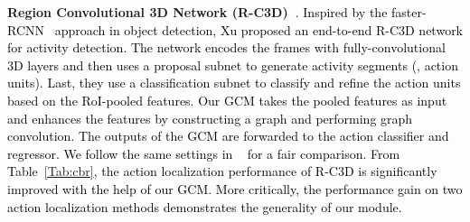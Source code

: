 \documentclass[10pt,journal,compsoc]{IEEEtran}
\def\hao{\textcolor{black}}
\begin{document}
	\noindent \textbf{Region Convolutional 3D Network (R-C3D)~\cite{xu2017r}}. \hao{Inspired by the faster-RCNN~\cite{ren2015faster} approach in object detection, Xu \etal proposed an end-to-end R-C3D network for activity detection. 
		The network encodes the frames with fully-convolutional 3D layers and then uses a proposal subnet to generate activity segments (\ie, action units). Last, they use a classification subnet to classify and refine the action units based on the RoI-pooled features. Our GCM takes the pooled features as input and enhances the features by constructing a graph and performing graph convolution. The outputs of the GCM are forwarded to the action classifier and regressor.
		We follow the same settings in ~\cite{xu2017r} for a fair comparison.  From Table~\ref{Tab:cbr}, the action localization performance of R-C3D is significantly improved with the help of our GCM. More critically, the performance gain on two action localization methods demonstrates the generality of our module.}
	

	
	\label{Sec:ablation}
\end{document}
